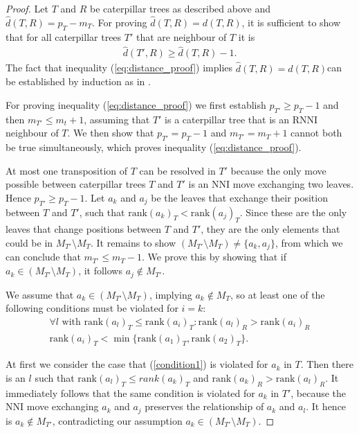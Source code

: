 \documentclass[11pt]{amsart}
\newcommand{\rnni}{\mathrm{RNNI}}
\newcommand{\rank}{\mathrm{rank}}
\newcommand{\nni}{\mathrm{NNI}}
\begin{document}
\begin{proof}
	Let $T$ and $R$ be caterpillar trees as described above and $\hat d(T,R) = p_T - m_T$.
	For proving $\hat d(T,R) = d(T,R)$, it is sufficient to show that for all caterpillar trees $T'$ that are neighbour of $T$ it is
	\begin{align}
		\hat d(T',R) \geq \hat d(T,R) - 1.
		\label{eq:distance_proof}
	\end{align}
	The fact that inequality (\ref{eq:distance_proof}) implies $\hat d(T,R) = d(T,R)$can be established by induction as in \autocite[Theorem 1]{Collienne2020-iu}.

	For proving inequality (\ref{eq:distance_proof}) we first establish $p_{T'} \geq p_T - 1$ and then $m_{T'} \leq m_t + 1$, assuming that $T'$ is a caterpillar tree that is an $\rnni$ neighbour of $T$.
	We then show that $p_{T'} = p_T - 1$ and $m_{T'} = m_T + 1$ cannot both be true simultaneously, which proves inequality (\ref{eq:distance_proof}).

	At most one transposition of $T$ can be resolved in $T'$ because the only move possible between caterpillar trees $T$ and $T'$ is an $\nni$ move exchanging two leaves.
	Hence $p_{T'} \geq p_T - 1$.
	Let $a_k$ and $a_j$ be the leaves that exchange their position between $T$ and $T'$, such that $\rank(a_k)_T < \rank(a_j)_T$.
	Since these are the only leaves that change positions between $T$ and $T'$, they are the only elements that could be in $M_{T'} \setminus M_T$.
	It remains to show $(M_{T'} \setminus M_T) \neq \{a_k, a_j\}$, from which we can conclude that $m_{T'} \leq m_T - 1$.
	We prove this by showing that if $a_k \in (M_{T'} \setminus M_T)$, it follows $a_j \notin M_{T'}$.

	We assume that $a_k \in (M_{T'} \setminus M_T)$, implying $a_k \notin M_T$, so at least one of the following conditions must be violated for $i = k$:
	\setcounter{equation}{0} %
	\renewcommand{\theequation}{C\arabic{equation}}
	\begin{align}
		\forall l \text{ with } \rank(a_l)_T \leq \rank(a_i)_T: \rank(a_l)_R > \rank(a_i)_R \label{condition1}\\
		\rank(a_i)_T < \min\{\rank(a_1)_T, \rank(a_2)_T\}.
		\label{condition2}
	\end{align}
	\setcounter{equation}{1}
	\renewcommand{\theequation}{\arabic{equation}}

	At first we consider the case that (\ref{condition1}) is violated for $a_k$ in $T$.
	Then there is an $l$ such that $\rank(a_l)_T \leq rank(a_k)_T$ and $\rank(a_k)_R > \rank(a_l)_R$.
	It immediately follows that the same condition is violated for $a_k$ in $T'$, because the $\nni$ move exchanging $a_k$ and $a_j$ preserves the relationship of $a_k$ and $a_l$.
	It hence is $a_k \notin M_{T'}$, contradicting our assumption $a_k \in (M_{T'} \setminus M_T)$.


\end{proof}
\end{document}
